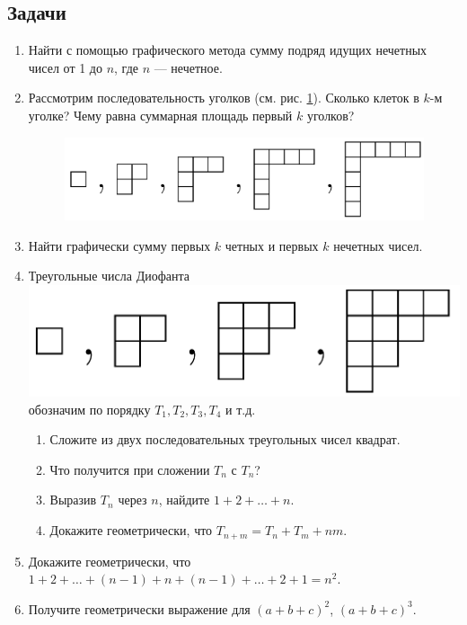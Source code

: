 \subsection*{Задачи}
\begin{enumerate}
\item Найти с помощью графического метода сумму подряд идущих нечетных чисел от 1 до $n$, где $n$ --- нечетное.
\item Рассмотрим последовательность уголков (см. рис. \ref{ugolki}). Сколько клеток в $k$-м уголке? Чему равна суммарная площадь первый $k$ уголков?
\begin{figure}[hbt!]
\begin{center}
 \includegraphics[scale=0.3]{../ugolki.png}
\end{center}
\caption{}\label{ugolki}
\end{figure}
\item Найти графически сумму первых $k$ четных и первых $k$ нечетных чисел.
\item Треугольные числа Диофанта  \includegraphics[scale=0.1]{../triangle.png} обозначим по порядку $T_1,T_2,T_3,T_4$ и т.д.
\begin{enumerate}
\item Сложите из двух последовательных треугольных чисел квадрат.
\item Что получится при сложении $T_n$ с $T_n$?
\item Выразив $T_n$ через $n$, найдите $1+2+\dots+n$.
\item Докажите геометрически, что $T_{n+m}=T_n+T_m+nm$.
\end{enumerate}
\item Докажите геометрически, что $1+2+\dots+(n-1)+n+(n-1)+\dots+2+1=n^2$.
\item Получите геометрически выражение для $(a+b+c)^2$, $(a+b+c)^3$.

\end{enumerate}
